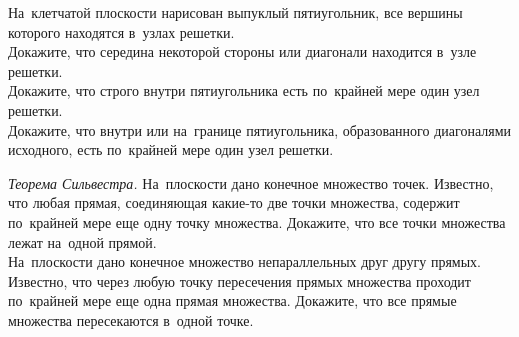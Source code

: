 \begin{problems}
\item
\begin{minipage}[t][][t]{0.79\linewidth}
На~клетчатой плоскости нарисован выпуклый пятиугольник, все вершины которого
находятся в~узлах решетки.
\\
\subproblem
Докажите, что середина некоторой стороны или диагонали находится в~узле
решетки.
\\
\subproblem
Докажите, что строго внутри пятиугольника есть по~крайней мере один узел
решетки.
\\
\subproblem
Докажите, что внутри или на~границе пятиугольника, образованного диагоналями
исходного, есть по~крайней мере один узел решетки.
\end{minipage}\hfill
\begin{minipage}[t][][b]{0.18\linewidth}
    \vspace{-1ex}
\end{minipage}

\item \emph{Теорема Сильвестра.}
\subproblem
На~плоскости дано конечное множество точек.
Известно, что любая прямая, соединяющая какие-то две точки множества, содержит
по~крайней мере еще одну точку множества.
Докажите, что все точки множества лежат на~одной прямой.
\\
\subproblem
На~плоскости дано конечное множество непараллельных друг другу прямых.
Известно, что через любую точку пересечения прямых множества проходит
по~крайней мере еще одна прямая множества.
Докажите, что все прямые множества пересекаются в~одной точке.

\end{problems}


